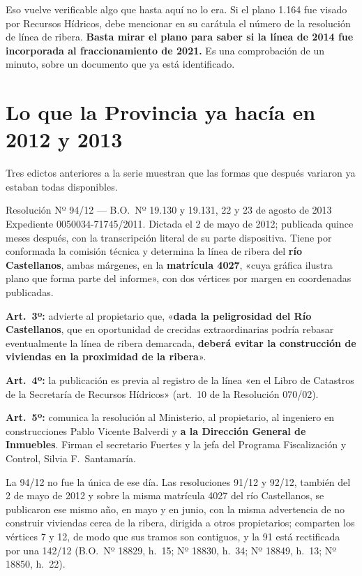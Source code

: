 Eso vuelve verificable algo que hasta aquí no lo era. Si el plano 1.164 fue visado por Recursos Hídricos, debe mencionar en su carátula el número de la resolución de línea de ribera. \textbf{Basta mirar el plano para saber si la línea de 2014 fue incorporada al fraccionamiento de 2021.} Es una comprobación de un minuto, sobre un documento que ya está identificado.

\section{Lo que la Provincia ya hacía en 2012 y 2013}

Tres edictos anteriores a la serie muestran que las formas que después variaron ya estaban todas disponibles.

\begin{ficha}{Resolución Nº 94/12 --- B.O.\ Nº 19.130 y 19.131, 22 y 23 de agosto de 2013}
Expediente 0050034-71745/2011. Dictada el 2 de mayo de 2012; publicada quince meses después, con la transcripción literal de su parte dispositiva. Tiene por conformada la comisión técnica y determina la línea de ribera del \textbf{río Castellanos}, ambas márgenes, en la \textbf{matrícula 4027}, «cuya gráfica ilustra plano que forma parte del informe», con dos vértices por margen en coordenadas publicadas.

\textbf{Art.\ 3º:} advierte al propietario que, «\textbf{dada la peligrosidad del Río Castellanos}, que en oportunidad de crecidas extraordinarias podría rebasar eventualmente la línea de ribera demarcada, \textbf{deberá evitar la construcción de viviendas en la proximidad de la ribera}».

\textbf{Art.\ 4º:} la publicación es previa al registro de la línea «en el Libro de Catastros de la Secretaría de Recursos Hídricos» (art.\ 10 de la Resolución 070/02).

\textbf{Art.\ 5º:} comunica la resolución al Ministerio, al propietario, al ingeniero en construcciones Pablo Vicente Balverdi y \textbf{a la Dirección General de Inmuebles}. Firman el secretario Fuertes y la jefa del Programa Fiscalización y Control, Silvia F.\ Santamaría.
\end{ficha}

La 94/12 no fue la única de ese día. Las resoluciones 91/12 y 92/12, también del 2 de mayo de 2012 y sobre la misma matrícula 4027 del río Castellanos, se publicaron ese mismo año, en mayo y en junio, con la misma advertencia de no construir viviendas cerca de la ribera, dirigida a otros propietarios; comparten los vértices 7 y 12, de modo que sus tramos son contiguos, y la 91 está rectificada por una 142/12 (B.O.\ Nº 18829, h.\ 15; Nº 18830, h.\ 34; Nº 18849, h.\ 13; Nº 18850, h.\ 22).

